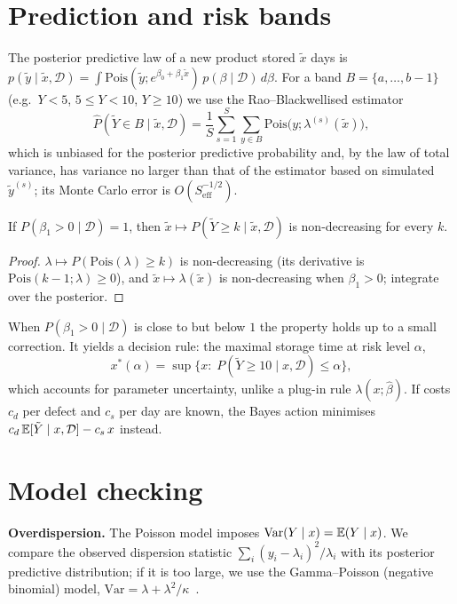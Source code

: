 \documentclass[10pt,twocolumn]{article}
\newcommand{\D}{\mathcal D}
\newcommand{\Pois}{\mathrm{Pois}}
\begin{document}
\section{Prediction and risk bands}
The posterior predictive law of a new product stored $\tilde x$ days is
$p(\tilde y\mid\tilde x,\D)=\int\Pois(\tilde y;e^{\beta_0+\beta_1\tilde x})\,p(\beta\mid\D)\,d\beta$.
For a band $B=\{a,\dots,b-1\}$ (e.g.\ $Y<5$, $5\le Y<10$, $Y\ge10$) we use the Rao--Blackwellised estimator
\begin{equation}
\hat P(\tilde Y\in B\mid\tilde x,\D)=\frac1S\sum_{s=1}^S\sum_{y\in B}\Pois\big(y;\lambda^{(s)}(\tilde x)\big),
\end{equation}
which is unbiased for the posterior predictive probability and, by the law of total variance, has variance no larger than that of the estimator based on simulated $\tilde y^{(s)}$; its Monte Carlo error is $O(S_{\mathrm{eff}}^{-1/2})$.
\begin{proposition}
If $P(\beta_1>0\mid\D)=1$, then $\tilde x\mapsto P(\tilde Y\ge k\mid\tilde x,\D)$ is non-decreasing for every $k$.
\end{proposition}
\begin{proof}
$\lambda\mapsto P(\Pois(\lambda)\ge k)$ is non-decreasing (its derivative is $\Pois(k-1;\lambda)\ge0$), and $\tilde x\mapsto\lambda(\tilde x)$ is non-decreasing when $\beta_1>0$; integrate over the posterior.
\end{proof}
When $P(\beta_1>0\mid\D)$ is close to but below $1$ the property holds up to a small correction. It yields a decision rule: the maximal storage time at risk level $\alpha$,
\begin{equation}
x^*(\alpha)=\sup\{x:\;P(\tilde Y\ge10\mid x,\D)\le\alpha\},
\end{equation}
which accounts for parameter uncertainty, unlike a plug-in rule $\lambda(x;\hat\beta)$. If costs $c_d$ per defect and $c_s$ per day are known, the Bayes action minimises $c_d\,\E[\tilde Y\mid x,\D]-c_s\,x$ instead.

\section{Model checking}
\textbf{Overdispersion.} The Poisson model imposes $\mathrm{Var}(Y\mid x)=\mathbb{E}(Y\mid x)$. We compare the observed dispersion statistic $\sum_i(y_i-\lambda_i)^2/\lambda_i$ with its posterior predictive distribution; if it is too large, we use the Gamma--Poisson (negative binomial) model, $\mathrm{Var}=\lambda+\lambda^2/\kappa$~\cite{gelman2013}.
\end{document}
